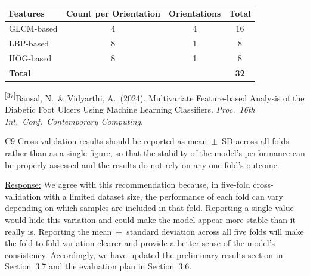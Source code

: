 \documentclass[12pt,a4paper]{article}
\newcommand{\cid}[1]{{\color{cidred}\underline{#1}}}
\newcommand{\mref}[1]{%
  \marginnote{%
    \color{respblue}\scriptsize
    \rule[-0.3ex]{0.6pt}{1.4ex}\hspace{4pt}%
    \parbox[t]{2.4cm}{\raggedright #1}%
  }%
}
\newenvironment{response}{%
  \par\color{respblue}%
}{\par}
\begin{document}
\begin{response}
\begin{center}
\label{tab:baseline_features}
\vspace{0.6em}
\begin{tabular}{lccc}
\toprule
\textbf{Features} & \textbf{Count per Orientation} & \textbf{Orientations} & \textbf{Total} \\
\midrule
GLCM-based & 4 & 4 & 16 \\
LBP-based  & 8 & 1 & 8  \\
HOG-based  & 8 & 1 & 8  \\
\midrule
\textbf{Total} & & & \textbf{32} \\
\bottomrule
\end{tabular}
\par\vspace{0.4em}
\raggedright\small\textsuperscript{[37]}Bansal, N.\ \& Vidyarthi, A.\ (2024). Multivariate Feature-based Analysis of the Diabetic Foot Ulcers Using Machine Learning Classifiers. \textit{Proc.\ 16th Int.\ Conf.\ Contemporary Computing}.
\end{center}
\end{response}

\cid{C9} Cross-validation results should be reported as mean~$\pm$~SD across all folds rather than as a single figure, so that the stability of the model's performance can be properly assessed and the results do not rely on any one fold's outcome.

\mref{\S~3.6\\Evaluation Plan\\[4pt]\S~3.7\\Preliminary\\Results}
\begin{response}
\underline{Response:} We agree with this recommendation because, in five-fold cross-validation with a limited dataset size, the performance of each fold can vary depending on which samples are included in that fold. Reporting a single value would hide this variation and could make the model appear more stable than it really is. Reporting the mean~$\pm$~standard deviation across all five folds will make the fold-to-fold variation clearer and provide a better sense of the model's consistency. Accordingly, we have updated the preliminary results section in Section~3.7 and the evaluation plan in Section~3.6.
\end{response}
\end{document}
